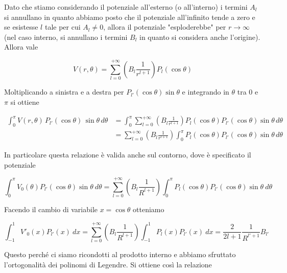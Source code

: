 Dato che stiamo considerando il potenziale all'esterno (o all'interno) i termini $A_l$ si annullano in quanto abbiamo posto che il potenziale all'infinito tende a zero e se esistesse $l$ tale per cui $A_l \neq 0$, allora il potenziale "esploderebbe" per $r \to \infty$ (nel caso interno, si annullano i termini $B_l$ in quanto si considera anche l'origine).\\

Allora vale 

\begin{equation*}
    V(r, \theta) = \sum_{l = 0} ^ {+ \infty} \left ( B_l \frac{1}{r^{l+1}} \right) P_l (\cos \theta)
\end{equation*}

Moltiplicando a sinistra e a destra per $P_{l'} (\cos \theta) \sin \theta$ e integrando in $\theta$ tra $0$ e $\pi$ si ottiene 

\begin{equation*}
\begin{aligned}
    \int_0^{\pi} V(r,\theta)\, P_{l'}(\cos\theta)\, \sin\theta \, d\theta
    &= \int_0^{\pi} \sum_{l=0}^{+\infty} \left( B_l \frac{1}{r^{l+1}} \right)
       P_l(\cos\theta) P_{l'}(\cos\theta) \sin\theta \, d\theta \\
    &= \sum_{l=0}^{+\infty} \left( B_l \frac{1}{r^{l+1}} \right)
       \int_0^{\pi} P_l(\cos\theta) P_{l'}(\cos\theta) \sin\theta \, d\theta
\end{aligned}
\end{equation*}

In particolare questa relazione è valida anche sul contorno, dove è specificato il potenziale

\begin{equation*}
    \int_0 ^{\pi} V_0(\theta) P_{l'} (\cos \theta) \sin \theta \ d \theta = \sum_{l = 0} ^ {+ \infty} \left ( B_l \frac{1}{R^{l+1}} \right) \int_0 ^{\pi} P_l (\cos \theta) P_{l'} (\cos \theta) \sin \theta \ d \theta
\end{equation*}

Facendo il cambio di variabile $x = \cos \theta$ otteniamo 

\begin{equation*}
    \int_{-1} ^{1} V'_0(x) P_{l'} (x) \ d x = \sum_{l = 0} ^ {+ \infty} \left ( B_l \frac{1}{R^{l+1}} \right) \int_{-1} ^{1} P_l (x) P_{l'} (x) \ d x = \frac{2}{2l +1} \frac{1}{R^{l'+1}} B_{l'}
\end{equation*}

Questo perché ci siamo ricondotti al prodotto interno e abbiamo sfruttato l'ortogonalità dei polinomi di Legendre. Si ottiene così la relazione 

